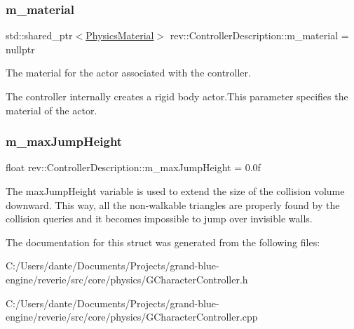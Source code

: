 \subsubsection{\texorpdfstring{m\_material}{m\_material}}
{\footnotesize\ttfamily std\+::shared\+\_\+ptr$<$\mbox{\hyperlink{classrev_1_1_physics_material}{Physics\+Material}}$>$ rev\+::\+Controller\+Description\+::m\+\_\+material = nullptr}



The material for the actor associated with the controller. 

The controller internally creates a rigid body actor.\+This parameter specifies the material of the actor. \mbox{\label{classrev_1_1_controller_description_ac7d3b080b8a9969824150ef5be4b8f32}} 
\subsubsection{\texorpdfstring{m\_maxJumpHeight}{m\_maxJumpHeight}}
{\footnotesize\ttfamily float rev\+::\+Controller\+Description\+::m\+\_\+max\+Jump\+Height = 0.\+0f}

The \textquotesingle{}max\+Jump\+Height\textquotesingle{} variable is used to extend the size of the collision volume downward. This way, all the non-\/walkable triangles are properly found by the collision queries and it becomes impossible to \textquotesingle{}jump over\textquotesingle{} invisible walls. 

The documentation for this struct was generated from the following files\+:\begin{DoxyCompactItemize}
\item 
C\+:/\+Users/dante/\+Documents/\+Projects/grand-\/blue-\/engine/reverie/src/core/physics/G\+Character\+Controller.\+h\item 
C\+:/\+Users/dante/\+Documents/\+Projects/grand-\/blue-\/engine/reverie/src/core/physics/G\+Character\+Controller.\+cpp\end{DoxyCompactItemize}
